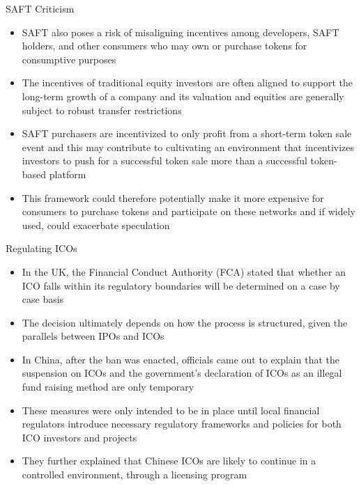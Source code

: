 \documentclass[10pt]{beamer}
\begin{document}

\begin{frame}{SAFT Criticism}
	\begin{itemize}
		\item SAFT also poses a risk of misaligning incentives among developers, SAFT holders, and other consumers who may own or purchase tokens for consumptive purposes
		\item The incentives of traditional equity investors are often aligned to support the long-term growth of a company and its valuation and equities are generally subject to robust transfer restrictions
		\item SAFT purchasers are incentivized to only profit from a short-term token sale event and this may contribute to cultivating an environment that incentivizes investors to push for a successful token sale more than a successful token-based platform
		\item This framework could therefore potentially make it more expensive for consumers to purchase tokens and participate on these networks and if widely used, could exacerbate speculation
	\end{itemize}
\end{frame}


\begin{frame}{Regulating ICOs}
	\begin{itemize}
		\item In the UK, the Financial Conduct Authority (FCA) stated that whether an ICO falls within its regulatory boundaries will be determined on a case by case basis
		\item The decision ultimately depends on how the process is structured, given the parallels between IPOs and ICOs
		\item In China, after the ban was enacted, officials came out to explain that the suspension on ICOs and the government's declaration of ICOs as an illegal fund raising method are only temporary
		\item These measures were only intended to be in place until local financial regulators introduce necessary regulatory frameworks and policies for both ICO investors and projects
		\item They further explained that Chinese ICOs are likely to continue in a controlled environment, through a licensing program
	\end{itemize}
\end{frame}
\end{document}
